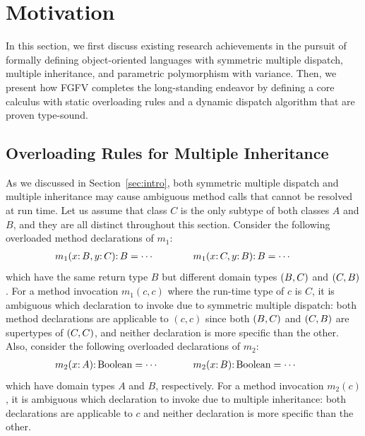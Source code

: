 \section{Motivation}\label{sec:motiv}
In this section, we first discuss existing research achievements in
the pursuit of formally defining object-oriented languages with symmetric
multiple dispatch, multiple inheritance, and parametric polymorphism with
variance.  Then, we present how FGFV completes the long-standing endeavor
by defining a core calculus with static overloading rules and a dynamic
dispatch algorithm that are proven type-sound.

\subsection{Overloading Rules for Multiple Inheritance}\label{sec:motiv:ff}
As we discussed in Section~\ref{sec:intro}, both symmetric multiple
dispatch and multiple inheritance may cause ambiguous method calls
that cannot be resolved at run time.  Let us assume that class $C$ is the only
subtype of both classes $A$ and $B$, and they are all distinct
throughout this section.  Consider
the following overloaded method declarations of $m_1$:
\[\begin{array}[ht]{l@{\hskip2em}l}
\hbox to 12 em{$m_1(x \COLON B, y \COLON C) \COLON B = \cdots$\hfil} & 
\hbox to 12 em{$m_1(x \COLON C, y \COLON B) \COLON B = \cdots$\hfil}
\end{array}\]
which have the same return type $B$ but different domain types
$\tuple{B,C}$ and $\tuple{C,B}$.  For a method invocation $m_1(c, c)$
where the run-time type of $c$ is $C$, it is ambiguous which declaration
to invoke due to symmetric multiple dispatch: both method declarations
are applicable to $(c, c)$ since both $\tuple{B,C}$ and $\tuple{C,B}$ are
supertypes of $\tuple{C,C}$, and neither declaration is more specific
than the other.  Also, consider the following overloaded declarations of
$m_2$:
\[\begin{array}[ht]{l@{\hskip2em}l}
\hbox to 12 em{$m_2(x \COLON A) \COLON \TYP{Boolean} = \cdots$\hfil} &
\hbox to 12 em{$m_2(x \COLON B) \COLON \TYP{Boolean} = \cdots$\hfil}
\end{array}\]
which have domain types $A$ and $B$, respectively.  For a method invocation $m_2(c)$,
it is ambiguous which declaration to invoke due to multiple inheritance:
both declarations are applicable to $c$ and neither declaration is more
specific than the other.

